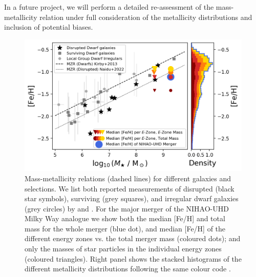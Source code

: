 \documentclass[fleqn,usenatbib]{mnras}
\begin{document}
In a future project, we will perform a detailed re-assessment of the mass-metallicity relation under full consideration of the metallicity distributions and inclusion of potential biases.%

\begin{figure}
    \centering
    \includegraphics[width=\columnwidth]{figures/mzr_different_selections.png}
    \caption{Mass-metallicity relations (dashed lines) for different galaxies and selections. We list both reported measurements of disrupted (black star symbols), surviving  (grey squares), and irregular dwarf galaxies (grey circles) by \citet{Kirby2013} and \citet{Naidu2022b}. For the major merger of the NIHAO-UHD Milky Way analogue we show both the median [Fe/H] and total mass for the whole merger (blue dot), and median [Fe/H] of the different energy zones vs. the total merger mass (coloured dots); and only the masses of star particles in the individual energy zones (coloured triangles). Right panel shows the stacked histograms of the different metallicity distributions following the same colour code \href{https://github.com/svenbuder/gse_nihaouhd/tree/main/figures}{\faGithub}.}
    \label{fig:mzr_different_selections}
\end{figure}
\end{document}
